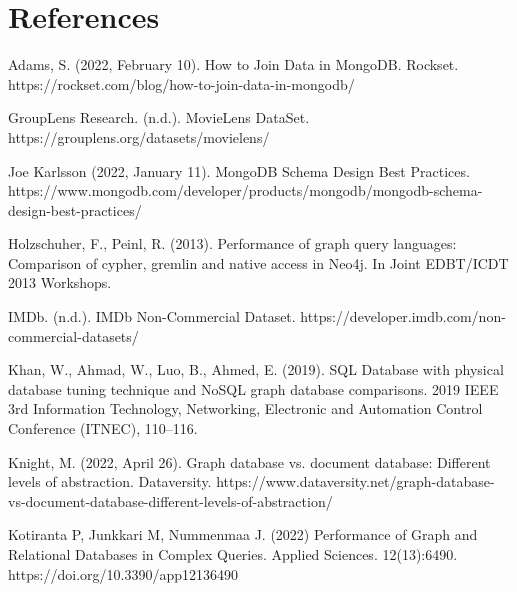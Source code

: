 \documentclass[10pt,titlepage]{article}
\begin{document}
\section{References}

Adams, S. (2022, February 10). How to Join Data in MongoDB. Rockset. https://rockset.com/blog/how-to-join-data-in-mongodb/

GroupLens Research. (n.d.). MovieLens DataSet. https://grouplens.org/datasets/movielens/

Joe Karlsson (2022, January 11). MongoDB Schema Design Best Practices. \\
https://www.mongodb.com/developer/products/mongodb/mongodb-schema-design-best-practices/

Holzschuher, F., Peinl, R. (2013). Performance of graph query languages: Comparison of cypher, gremlin and native access in Neo4j. In Joint EDBT/ICDT 2013 Workshops.

IMDb. (n.d.). IMDb Non-Commercial Dataset. https://developer.imdb.com/non-commercial-datasets/

Khan, W., Ahmad, W., Luo, B., Ahmed, E. (2019). SQL Database with physical database tuning technique and NoSQL graph database comparisons. 2019 IEEE 3rd Information Technology, Networking, Electronic and Automation Control Conference (ITNEC), 110–116. 

Knight, M. (2022, April 26). Graph database vs. document database: Different levels of abstraction. Dataversity. https://www.dataversity.net/graph-database-vs-document-database-different-levels-of-abstraction/ 

Kotiranta P, Junkkari M, Nummenmaa J. (2022) Performance of Graph and Relational Databases in Complex Queries. Applied Sciences. 12(13):6490. https://doi.org/10.3390/app12136490
\end{document}
